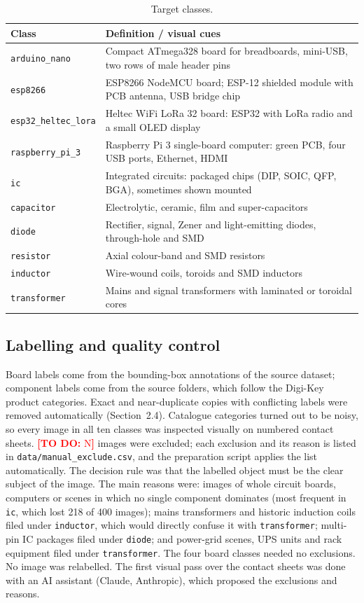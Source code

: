 \documentclass[11pt,a4paper]{article}
\newcommand{\fillin}[1]{\textcolor{red}{\textbf{[TO DO:} #1\textbf{]}}}
\providecommand{\NumManual}{\fillin{N}}
\begin{document}
\begin{table}[H]\centering\small
\caption{Target classes.}\label{tab:classes}
\begin{tabular}{lp{11cm}}\toprule
Class & Definition / visual cues \\\midrule
\texttt{arduino\_nano} & Compact ATmega328 board for breadboards, mini-USB, two rows of male header pins \\
\texttt{esp8266} & ESP8266 NodeMCU board; ESP-12 shielded module with PCB antenna, USB bridge chip \\
\texttt{esp32\_heltec\_lora} & Heltec WiFi LoRa 32 board: ESP32 with LoRa radio and a small OLED display \\
\texttt{raspberry\_pi\_3} & Raspberry Pi 3 single-board computer: green PCB, four USB ports, Ethernet, HDMI \\
\texttt{ic} & Integrated circuits: packaged chips (DIP, SOIC, QFP, BGA), sometimes shown mounted \\
\texttt{capacitor} & Electrolytic, ceramic, film and super-capacitors \\
\texttt{diode} & Rectifier, signal, Zener and light-emitting diodes, through-hole and SMD \\
\texttt{resistor} & Axial colour-band and SMD resistors \\
\texttt{inductor} & Wire-wound coils, toroids and SMD inductors \\
\texttt{transformer} & Mains and signal transformers with laminated or toroidal cores \\
\bottomrule\end{tabular}\end{table}

\subsection{Labelling and quality control}
Board labels come from the bounding-box annotations of the source dataset; component labels come from the source folders, which follow the Digi-Key product categories. Exact and near-duplicate copies with conflicting labels were removed automatically (Section~2.4). Catalogue categories turned out to be noisy, so every image in all ten classes was inspected visually on numbered contact sheets. \NumManual{} images were excluded; each exclusion and its reason is listed in \texttt{data/manual\_exclude.csv}, and the preparation script applies the list automatically. The decision rule was that the labelled object must be the clear subject of the image. The main reasons were: images of whole circuit boards, computers or scenes in which no single component dominates (most frequent in \texttt{ic}, which lost 218 of 400 images); mains transformers and historic induction coils filed under \texttt{inductor}, which would directly confuse it with \texttt{transformer}; multi-pin IC packages filed under \texttt{diode}; and power-grid scenes, UPS units and rack equipment filed under \texttt{transformer}. The four board classes needed no exclusions. No image was relabelled. The first visual pass over the contact sheets was done with an AI assistant (Claude, Anthropic), which proposed the exclusions and reasons.
\end{document}
